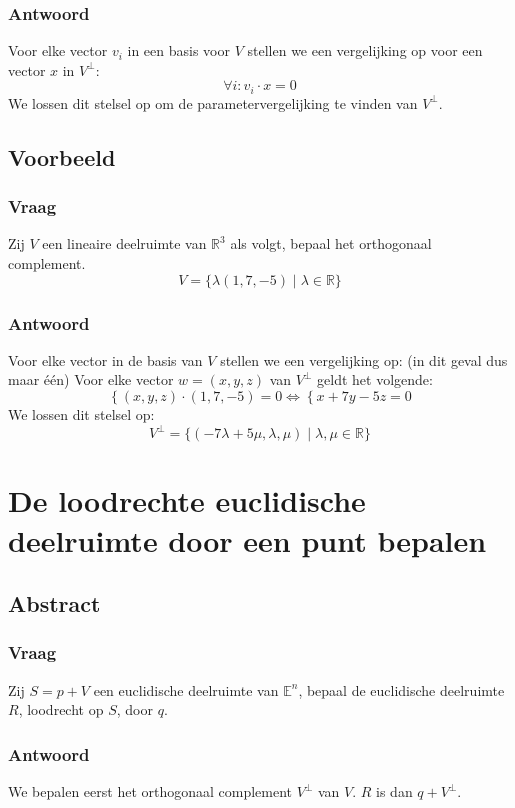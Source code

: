 \documentclass[main.tex]{subfiles}
\begin{document}
\subsubsection*{Antwoord}
Voor elke vector $v_{i}$ in een basis voor $V$ stellen we een vergelijking op voor een vector $x$ in $V^{\bot}$:
\[ \forall i: v_{i}\cdot x = 0 \]
We lossen dit stelsel op om de parametervergelijking te vinden van $V^{\bot}$.

\subsection*{Voorbeeld}
\subsubsection*{Vraag}
\begin{center}
  Zij $V$ een lineaire deelruimte van $\mathbb{R}^{3}$ als volgt, bepaal het orthogonaal complement.
  \[ V = \{ \lambda(1,7,-5) \mid \lambda \in \mathbb{R} \} \]
\end{center}
\subsubsection*{Antwoord}
Voor elke vector in de basis van $V$ stellen we een vergelijking op: (in dit geval dus maar \'e\'en)
Voor elke vector $w=(x,y,z)$ van $V^{\bot}$ geldt het volgende:
\[ \left\{ (x,y,z) \cdot (1,7,-5) = 0\right. \Leftrightarrow \left\{ x+7y-5z=0 \right. \]
We lossen dit stelsel op:
\[ V^{\bot} = \{ (-7\lambda+5\mu,\lambda,\mu) \mid \lambda,\mu \in \mathbb{R} \} \]

\newpage
\section{De loodrechte euclidische deelruimte door een punt bepalen}
\label{sec:loodrechte-op-euclidische-deelruimte}
\subsection*{Abstract}
\subsubsection*{Vraag}
\begin{center}
  Zij $S=p+V$ een euclidische deelruimte van $\mathbb{E}^{n}$, bepaal de euclidische deelruimte $R$, loodrecht op $S$, door $q$.
\end{center}
\subsubsection*{Antwoord}
We bepalen eerst het orthogonaal complement $V^{\bot}$ van $V$.
$R$ is dan $q+V^{\bot}$.
\end{document}
